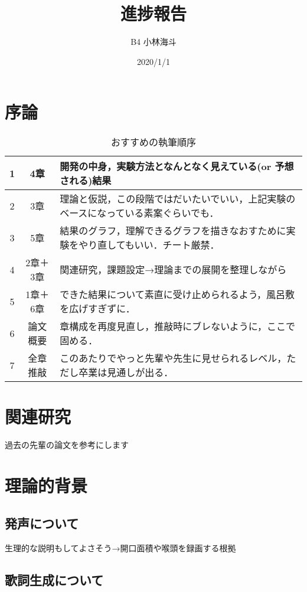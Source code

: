 \documentclass[10ptj,a4j,dvipdfmx,uplatex]{jsbook}
\title{進捗報告}
\author{B4 小林海斗}
\date{2020/1/1}
\begin{document}

\chapter{序論}

\begin{table}[h]
\caption{おすすめの執筆順序}%
\begin{center}
\begin{tabular}{|c|c|l|} %
\hline
1 & 4章 & 開発の中身，実験方法となんとなく見えている(or 予想される)結果 \\
\hline
2 & 3章 & 理論と仮説，この段階ではだいたいでいい，上記実験のベースになっている素案ぐらいでも． \\
\hline
3 & 5章 & 結果のグラフ，理解できるグラフを描きなおすために実験をやり直してもいい．チート厳禁． \\
\hline
4 & 2章＋3章 & 関連研究，課題設定→理論までの展開を整理しながら \\
\hline
5 & 1章＋6章 & できた結果について素直に受け止められるよう，風呂敷を広げすぎずに． \\
\hline
6 & 論文概要 & 章構成を再度見直し，推敲時にブレないように，ここで固める． \\
\hline
7 & 全章推敲 & このあたりでやっと先輩や先生に見せられるレベル，ただし卒業は見通しが出る． \\
\hline
\end{tabular}
\end{center}
\end{table}

\chapter{関連研究}
過去の先輩の論文を参考にします

\chapter{理論的背景}
\section{発声について}
生理的な説明もしてよさそう→開口面積や喉頭を録画する根拠

\section{歌詞生成について}
\end{document}
